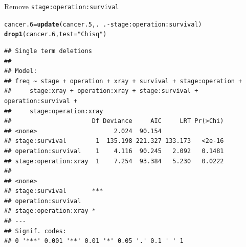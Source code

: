 \documentclass[unknownkeysallowed]{beamer}\usepackage[]{graphicx}\usepackage[]{color}
\makeatletter
\newcommand{\hlstr}[1]{\textcolor[rgb]{0.192,0.494,0.8}{#1}}%
\newcommand{\hlopt}[1]{\textcolor[rgb]{0,0,0}{#1}}%
\newcommand{\hlstd}[1]{\textcolor[rgb]{0.345,0.345,0.345}{#1}}%
\newcommand{\hlkwb}[1]{\textcolor[rgb]{0.69,0.353,0.396}{#1}}%
\newcommand{\hlkwc}[1]{\textcolor[rgb]{0.333,0.667,0.333}{#1}}%
\newcommand{\hlkwd}[1]{\textcolor[rgb]{0.737,0.353,0.396}{\textbf{#1}}}%
\newenvironment{kframe}{%
 \def\at@end@of@kframe{}%
 \ifinner\ifhmode%
  \def\at@end@of@kframe{\end{minipage}}%
  \begin{minipage}{\columnwidth}%
 \fi\fi%
 \def\FrameCommand##1{\hskip\@totalleftmargin \hskip-\fboxsep
 \colorbox{shadecolor}{##1}\hskip-\fboxsep
     \hskip-\linewidth \hskip-\@totalleftmargin \hskip\columnwidth}%
 \MakeFramed {\advance\hsize-\width
   \@totalleftmargin\z@ \linewidth\hsize
   \@setminipage}}%
 {\par\unskip\endMakeFramed%
 \at@end@of@kframe}
\newenvironment{knitrout}{}{} %
\makeatother
\begin{document}
\begin{frame}[fragile]{Remove \texttt{stage:operation:survival}}
  
\begin{knitrout}\scriptsize
{}\color{fgcolor}\begin{kframe}
\begin{alltt}
\hlstd{cancer.6}\hlkwb{=}\hlkwd{update}\hlstd{(cancer.5,.}\hlopt{~}\hlstd{.}\hlopt{-}\hlstd{stage}\hlopt{:}\hlstd{operation}\hlopt{:}\hlstd{survival)}
\hlkwd{drop1}\hlstd{(cancer.6,}\hlkwc{test}\hlstd{=}\hlstr{"Chisq"}\hlstd{)}
\end{alltt}
\begin{verbatim}
## Single term deletions
## 
## Model:
## freq ~ stage + operation + xray + survival + stage:operation + 
##     stage:xray + operation:xray + stage:survival + operation:survival + 
##     stage:operation:xray
##                      Df Deviance     AIC     LRT Pr(>Chi)
## <none>                     2.024  90.154                 
## stage:survival        1  135.198 221.327 133.173   <2e-16
## operation:survival    1    4.116  90.245   2.092   0.1481
## stage:operation:xray  1    7.254  93.384   5.230   0.0222
##                         
## <none>                  
## stage:survival       ***
## operation:survival      
## stage:operation:xray *  
## ---
## Signif. codes:  
## 0 '***' 0.001 '**' 0.01 '*' 0.05 '.' 0.1 ' ' 1
\end{verbatim}
\end{kframe}
\end{knitrout}
  
  
\end{frame}
\end{document}
